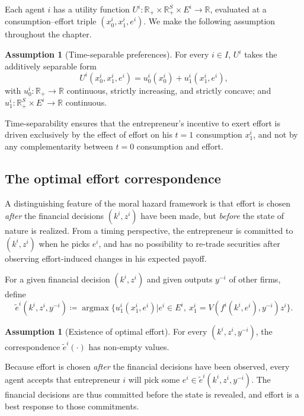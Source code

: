 \documentclass[11pt,a4paper,oneside]{book}
\def\R{\mathbb{R}}
\DeclareMathOperator*{\argmax}{argmax}
\theoremstyle{plain}
\theoremstyle{definition}
\newtheorem{assumption}[theorem]{Assumption}
\theoremstyle{remark}
\numberwithin{equation}{chapter}
\begin{document}
Each agent $i$ has a utility function $U^i : \R_+ \times \R_+^S \times E^i \to \R$, evaluated at a consumption--effort triple $(x^i_0, x^i_1, e^i)$.
We make the following assumption throughout the chapter.

\begin{assumption}[Time-separable preferences]\label{ass:time-sep}
For every $i \in I$, $U^i$ takes the additively separable form
\begin{equation}\label{eq:time-sep}
  U^i(x^i_0, x^i_1, e^i) = u^i_0(x^i_0) + u^i_1(x^i_1, e^i),
\end{equation}
with $u^i_0 : \R_+ \to \R$ continuous, strictly increasing, and strictly concave; and $u^i_1 : \R_+^S \times E^i \to \R$ continuous.
\end{assumption}

Time-separability ensures that the entrepreneur's incentive to exert effort is driven exclusively by the effect of effort on his $t=1$ consumption $x^i_1$, and not by any complementarity between $t=0$ consumption and effort.

\subsection{The optimal effort correspondence}

A distinguishing feature of the moral hazard framework is that effort is chosen \emph{after} the financial decisions $(k^i, z^i)$ have been made, but \emph{before} the state of nature is realized.
From a timing perspective, the entrepreneur is committed to $(k^i, z^i)$ when he picks $e^i$, and has no possibility to re-trade securities after observing effort-induced changes in his expected payoff.

For a given financial decision $(k^i, z^i)$ and given outputs $y^{-i}$ of other firms, define
\begin{equation}\label{eq:opt-effort}
  \widetilde{e}^i(k^i, z^i, y^{-i})
  \coloneqq \argmax \bigl\{ u^i_1(x^i_1, e^i) \vert e^i \in E^i, \ x^i_1 = V(f^i(k^i, e^i), y^{-i}) z^i \bigr\}.
\end{equation}

\begin{assumption}[Existence of optimal effort]\label{ass:opt-effort-exists}
For every $(k^i, z^i, y^{-i})$, the correspondence $\widetilde{e}^i(\cdot)$ has non-empty values.
\end{assumption}

Because effort is chosen \emph{after} the financial decisions have been observed, every agent accepts that entrepreneur $i$ will pick some $e^i \in \widetilde{e}^i(k^i, z^i, y^{-i})$.
The financial decisions are thus committed before the state is revealed, and effort is a best response to those commitments.
\end{document}
